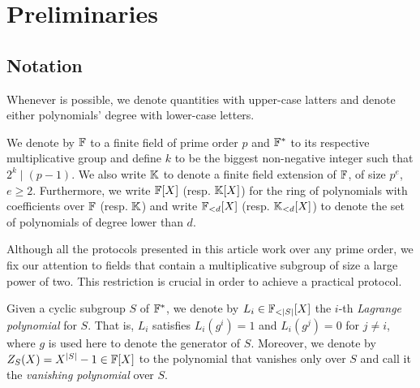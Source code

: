 \section{Preliminaries}

\subsection{Notation}

Whenever is possible, we denote quantities with upper-case latters and denote either polynomials' degree with lower-case letters.

We denote by $\mathbb{F}$ to a finite field of prime order $p$ and $\mathbb{F}^*$ to its respective multiplicative group and define $k$ to be the biggest non-negative integer such that $2^k \mid (p-1)$. We also write $\mathbb{K}$ to denote a finite field extension of $\mathbb{F}$, of size $p^e$, $e \geq 2$. 
Furthermore, we write $\mathbb{F}[X]$ (resp. $\mathbb{K}[X]$) for the ring of polynomials with coefficients over $\mathbb{F}$ (resp. $\mathbb{K}$) and write $\mathbb{F}_{<d}[X]$ (resp. $\mathbb{K}_{<d}[X]$) to denote the set of polynomials of degree lower than $d$.

Although all the protocols presented in this article work over any prime order, we fix our attention to fields that contain a multiplicative subgroup of size a large power of two. This restriction is crucial in order to achieve a practical protocol.


Given a cyclic subgroup $S$ of $\mathbb{F}^*$, we denote by $L_i \in \FF_{<|S|}[X]$ the $i$-th \textit{Lagrange polynomial} for $S$. That is, $L_i$ satisfies $L_i(g^i) = 1$ and $L_i(g^j) = 0$ for $j \neq i$, where $g$ is used here to denote the generator of $S$. Moreover, we denote by $Z_S(X) = X^{|S|} - 1 \in \mathbb{F}[X]$ to the polynomial that vanishes only over $S$ and call it the \textit{vanishing polynomial} over $S$.

